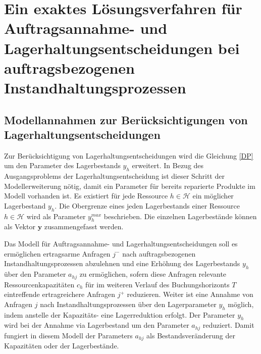 \chapter{Ein exaktes Lösungsverfahren für Auftragsannahme- und Lagerhaltungsentscheidungen bei auftragsbezogenen Instandhaltungsprozessen}\label{HauptteilDP}
\setcounter{footnote}{7}

\section{Modellannahmen zur Berücksichtigungen von Lagerhaltungsentscheidungen}


Zur Berücksichtigung von Lagerhaltungsentscheidungen wird die Gleichung \eqref{DP} um den Parameter des Lagerbestands $y_{h}$ erweitert. In Bezug des Ausgangsproblems der Lagerhaltungsentscheidung ist dieser Schritt der Modellerweiterung nötig, damit ein Parameter für bereits reparierte Produkte im Modell vorhanden ist. Es existiert für jede Ressource $h\in\mathcal{H}$ ein möglicher Lagerbestand $y_h$. Die Obergrenze eines jeden Lagerbestands einer Ressource $h\in\mathcal{H}$ wird als Parameter $y_{h}^{max}$ beschrieben. Die einzelnen Lagerbestände können als Vektor $\textbf{y}$ zusammengefasst werden. %


Das Modell für Auftragsannahme- und Lagerhaltungsentscheidungen soll es ermöglichen ertragsarme Anfragen $j^{-}$ nach auftragsbezogenen Instandhaltungsprozessen abzulehnen und eine Erhöhung des Lagerbestands $y_{h}$ über den Parameter $a_{hj}$ zu ermöglichen, sofern diese Anfragen relevante Ressourcenkapazitäten $c_{h}$ für im weiteren Verlauf des Buchungshorizonts $T$ eintreffende ertragreichere Anfragen $j^{+}$ reduzieren. Weiter ist eine Annahme von Anfragen $j$ nach Instandhaltungsprozessen über den Lagerparameter $y_{h}$ möglich, indem anstelle der Kapazitäts- eine Lagerreduktion erfolgt. Der Parameter $y_{h}$ wird bei der Annahme via Lagerbestand um den Parameter $a_{hj}$ reduziert. Damit fungiert in diesem Modell der Parameters $a_{hj}$ als Bestandsveränderung der Kapazitäten oder der Lagerbestände. 

